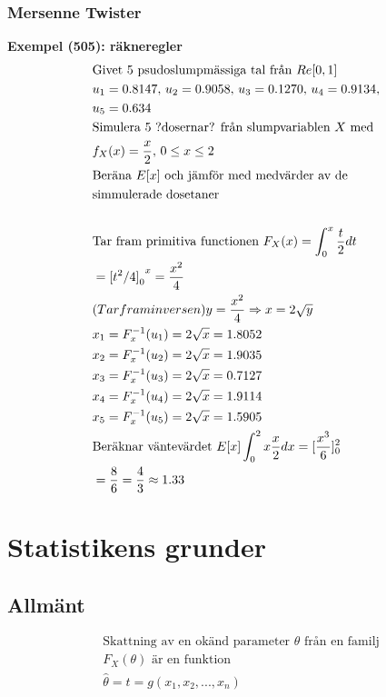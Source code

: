 \begin{multicols}{2}
\subsubsection{Mersenne Twister}
\noindent\textbf{Exempel (505): räkneregler}
\begin{align*}
  &\text{Givet $5$ psudoslumpmässiga tal från $Re[0,1]$} \\
  &u_1=0.8147, \, u_2=0.9058, \, u_3=0.1270, \, u_4=0.9134, \\
  &u_5=0.634 \\
  &\text{Simulera $5$ ?dosernar? från slumpvariablen $X$ med }\\
  &f_X(x)=\frac{x}{2}, \, 0 \leq x \leq 2 \\
  &\text{Beräna $E[x]$ och jämför med medvärder av de} \\
  &\text{simmulerade dosetaner} \\
  &\\
  &\text{Tar fram primitiva functionen } F_X(x)=\int_0^x \frac{t}{2}dt \\
  &= {{[t^2/4]}_0}^x=\frac{x^2}{4} \\
  &\text(Tar fram inversen ) y=\frac{x^2}{4} \Rightarrow x=2\sqrt{y} \\
  &x_1=F_x^{-1}(u_1) = 2\sqrt{x} = 1.8052 \\
  &x_2=F_x^{-1}(u_2) = 2\sqrt{x} = 1.9035 \\
  &x_3=F_x^{-1}(u_3) = 2\sqrt{x} = 0.7127 \\
  &x_4=F_x^{-1}(u_4) = 2\sqrt{x} = 1.9114 \\
  &x_5=F_x^{-1}(u_5) = 2\sqrt{x} = 1.5905 \\
  &\text{Beräknar väntevärdet } E[x] \int_0^2x\frac{x}{2}dx=[\frac{x^3}{6}]_0^2 \\
  &= \frac{8}{6} = \frac{4}{3} \approx 1.33 \\
\end{align*}

\section{Statistikens grunder}
\subsection{Allmänt}
\begin{align*}
  &\text{Skattning av en okänd parameter $\theta$ från en familj} \\
  &F_X(\theta) \text{ är en funktion}  \\
  &\hat{\theta} = t = g(x_1,x_2,...,x_n) \\
\end{align*}


\end{multicols}
